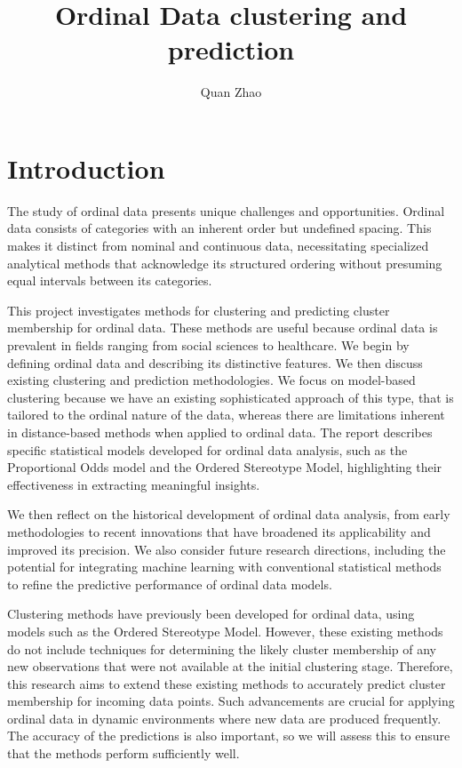\documentclass{article}
\begin{document}
\title{Ordinal Data clustering and prediction}

\author{Quan Zhao}

\maketitle

\section{Introduction}


The study of ordinal data presents unique challenges and opportunities.
Ordinal data consists of categories with an inherent order but undefined
spacing. This makes it distinct from nominal and continuous data,
necessitating specialized analytical methods that acknowledge its
structured ordering without presuming equal intervals between its
categories.

This project investigates methods for clustering and predicting cluster
membership for ordinal data. These methods are useful because ordinal
data is prevalent in fields ranging from social sciences to healthcare.
We begin by defining ordinal data and describing its distinctive
features. We then discuss existing clustering and prediction
methodologies. We focus on model-based clustering because we have an
existing sophisticated approach of this type, that is tailored to the
ordinal nature of the data, whereas there are limitations inherent in
distance-based methods when applied to ordinal data. The report
describes specific statistical models developed for ordinal data
analysis, such as the Proportional Odds model and the Ordered Stereotype
Model, highlighting their effectiveness in extracting meaningful
insights.

We then reflect on the historical development of ordinal data analysis,
from early methodologies to recent innovations that have broadened its
applicability and improved its precision. We also consider future
research directions, including the potential for integrating machine
learning with conventional statistical methods to refine the predictive
performance of ordinal data models.

Clustering methods have previously been developed for ordinal data,
using models such as the Ordered Stereotype Model. However, these
existing methods do not include techniques for determining the likely
cluster membership of any new observations that were not available at
the initial clustering stage. Therefore, this research aims to extend
these existing methods to accurately predict cluster membership for
incoming data points. Such advancements are crucial for applying ordinal
data in dynamic environments where new data are produced frequently. The
accuracy of the predictions is also important, so we will assess this to
ensure that the methods perform sufficiently well.
\end{document}
